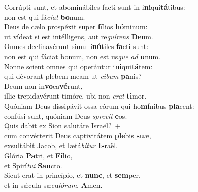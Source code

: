 \evenverse Corrúpti sunt, et abominábiles facti sunt in i\textbf{ni}qui\textbf{tá}tibus:~\*\\
\evenverse non est qui fá\textit{ci}\textit{at} \textbf{bo}num.\\
\oddverse Deus de cælo prospéxit super \textbf{fí}lios \textbf{hó}minum:~\*\\
\oddverse ut vídeat si est intélligens, aut re\textit{quí}\textit{rens} \textbf{De}um.\\
\evenverse Omnes declinavérunt simul i\textbf{nú}tiles \textbf{fa}cti sunt:~\*\\
\evenverse non est qui fáciat bonum, non est us\textit{que} \textit{ad} \textbf{u}num.\\
\oddverse Nonne scient omnes qui operántur i\textbf{ni}qui\textbf{tá}tem:~\*\\
\oddverse qui dévorant plebem meam ut \textit{ci}\textit{bum} \textbf{pa}nis?\\
\evenverse Deum non in\textbf{vo}ca\textbf{vé}runt,~\*\\
\evenverse illic trepidavérunt timóre, ubi non \textit{e}\textit{rat} \textbf{ti}mor.\\
\oddverse Quóniam Deus dissipávit ossa eórum qui ho\textbf{mí}nibus \textbf{pla}cent:~\*\\
\oddverse confúsi sunt, quóniam Deus \textit{spre}\textit{vit} \textbf{e}os.\\
\evenverse Quis dabit ex Sion salutáre Israël?~+\\
\evenverse  cum convérterit Deus captivitátem \textbf{ple}bis \textbf{su}æ,~\*\\
\evenverse exsultábit Jacob, et lætá\textit{bi}\textit{tur} \textbf{Is}raël.\\
\oddverse Glória \textbf{Pa}tri, et \textbf{Fí}lio,~\*\\
\oddverse et Spirí\textit{tu}\textit{i} \textbf{San}cto.\\
\evenverse Sicut erat in princípio, et \textbf{nunc}, et \textbf{sem}per,~\*\\
\evenverse et in sǽcula sæcu\textit{ló}\textit{rum}. \textbf{A}men.\\
